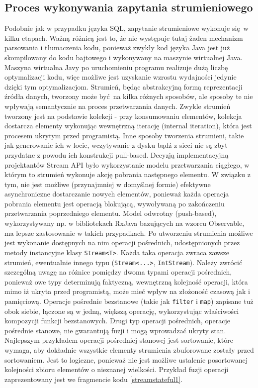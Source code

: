 \documentclass[12pt]{extarticle}
\begin{document}
\subsection{Proces wykonywania zapytania strumieniowego}

    Podobnie jak w przypadku języka SQL, zapytanie strumieniowe wykonuje się w kilku etapach. Ważną różnicą jest to, że nie występuje tutaj żaden mechanizm parsowania i tłumaczenia kodu, ponieważ zwykły kod języka Java jest już skompilowany do kodu bajtowego i wykonywany na maszynie wirtualnej Java. Maszyna wirtualna Javy po uruchomieniu programu realizuje dużą liczbę optymalizacji kodu, więc możliwe jest uzyskanie wzrostu wydajności jedynie dzięki tym optymalizacjom.
    Strumień, będąc abstrakcyjną formą reprezentacji źródła danych, tworzony może być na kilka różnych sposobów, ale sposoby te nie wpływają semantycznie na proces przetwarzania danych. Zwykle strumień tworzony jest na podstawie kolekcji - przy konsumowaniu elementów, kolekcja dostarcza elementy wykonując wewnętrzną iterację (internal iteration), która jest procesem ukrytym przed programistą. Inne sposoby tworzenia strumieni, takie jak generowanie ich w locie, wczytywanie z dysku bądź z sieci nie są zbyt przydatne z powodu ich konstrukcji pull-based. Decyzją implementacyjną projektantów Stream API było wykorzystanie modelu przetwarzania ciągłego, w którym to strumień wykonuje akcję pobrania następnego elementu. W związku z tym, nie jest możliwe (przynajmniej w domyślnej formie) efektywne asynchroniczne dostarczanie nowych elementów, ponieważ każda operacja pobrania elementu jest operacją blokującą, wywoływaną po zakończeniu przetwarzania poprzedniego elementu. Model odwrotny (push-based), wykorzystywany np. w bibliotekach RxJava bazujących na wzorcu Observable, ma lepsze zastosowanie w takich przypadkach.
    Po utworzeniu strumienia możliwe jest wykonanie dostępnych na nim operacji pośrednich, udostępnionych przez metody instancyjne klasy \texttt{Stream<T>}. Każda taka operacja zwraca zawsze strumień, ewentualnie innego typu (\texttt{Stream<...>}, \texttt{IntStream}). Należy zwrócić szczególną uwagę na różnice pomiędzy dwoma typami operacji pośrednich, ponieważ owe typy determinują faktyczną, wewnętrzną kolejność operacji, która mimo iż ukryta przed programistą, może mieć wpływ na złożoność czasową jak i pamięciową. Operacje pośrednie bezstanowe (takie jak \texttt{filter} i \texttt{map}) zapisane tuż obok siebie, łączone są w jedną, większą operację, wykorzystując właściwości kompozycji funkcji bezstanowych. Drugi typ operacji pośrednich, operacje pośrednie stanowe, nie gwarantują fuzji i mogą wprowadzać ukryty stan. Najlepszym przykładem operacji pośredniej stanowej jest sortowanie, które wymaga, aby dokładnie wszystkie elementy strumienia zbuforowane zostały przed sortowaniem. Jest to logiczne, ponieważ nie jest możliwe ustalenie posortowanej kolejności zbioru elementów o nieznanej wielkości. Przykład fuzji operacji zaprezentowany jest we fragmencie kodu \ref{streamstateful1}.
\end{document}
